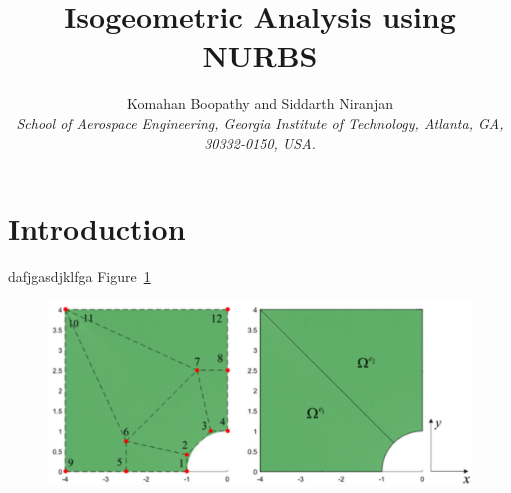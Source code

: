 \documentclass[]{aiaa-pretty} %
\title{Isogeometric Analysis using NURBS}
\author{Komahan Boopathy  and Siddarth Niranjan\\
  {\normalsize\itshape School of Aerospace Engineering, Georgia Institute of Technology,
    Atlanta, GA, 30332-0150, USA.}\\
}
\begin{document}
\maketitle
\section{Introduction}
dafjgasdjklfga
Figure~\ref{fig:iga-demo} 
\begin{figure}[h] 
  \centering
  \includegraphics[width=1.0\linewidth]{iga-demo.pdf}
  \caption{\emph{}}
  \label{fig:iga-demo}
\end{figure}



\end{document}
